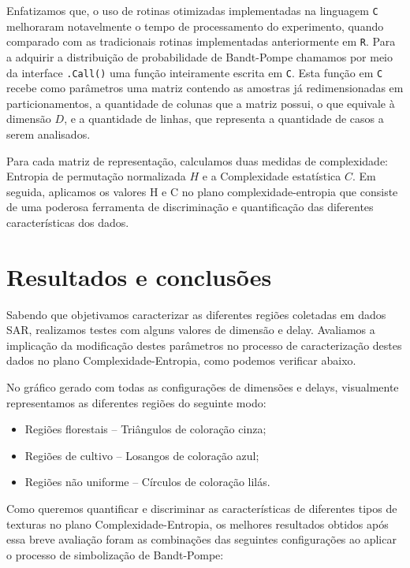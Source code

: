 \documentclass[12pt]{article}
\begin{document}
Enfatizamos que, o uso de rotinas otimizadas implementadas na linguagem \texttt C melhoraram notavelmente o tempo de processamento do experimento, quando comparado com as tradicionais rotinas implementadas anteriormente em \texttt R. Para a adquirir a distribuição de probabilidade de Bandt-Pompe chamamos por meio da interface \texttt{.Call()} uma função inteiramente escrita em \texttt C. Esta função em \texttt C recebe como parâmetros uma matriz contendo as amostras já redimensionadas em particionamentos, a quantidade de colunas que a matriz possui, o que equivale à dimensão $D$, e a quantidade de linhas, que representa a quantidade de casos a serem analisados.

Para cada matriz de representação, calculamos duas medidas de complexidade: Entropia de permutação normalizada $H$ e a Complexidade estatística $C$. Em seguida, aplicamos os valores H e C no plano complexidade-entropia que consiste de uma poderosa ferramenta de discriminação e quantificação das diferentes características dos dados.

\section{Resultados e conclusões}

Sabendo que objetivamos caracterizar as diferentes regiões coletadas em dados SAR, realizamos testes com alguns valores de dimensão e delay. Avaliamos a implicação da modificação destes parâmetros no processo de caracterização destes dados no plano Complexidade-Entropia, como podemos verificar abaixo. 

No gráfico gerado com todas as configurações de dimensões e delays, visualmente representamos as diferentes regiões do seguinte modo:

\begin{itemize}
    \item Regiões florestais -- Triângulos de coloração cinza; 
    \item Regiões de cultivo -- Losangos de coloração azul;
    \item Regiões não uniforme -- Círculos de coloração lilás.
\end{itemize}

Como queremos quantificar e discriminar as características de diferentes tipos de texturas no plano Complexidade-Entropia, os melhores resultados obtidos após essa breve avaliação foram as combinações das seguintes configurações ao aplicar o processo de simbolização de Bandt-Pompe:
\end{document}
